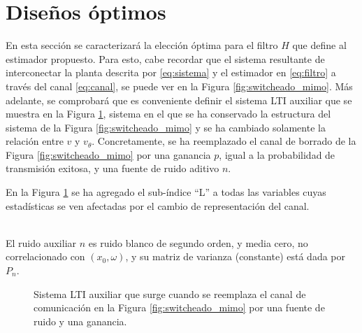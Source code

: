 \section{Dise\~nos \'optimos}\label{sec:diseno_mimo} 
En esta secci\'on se caracterizar\'a la elecci\'on \'optima para el filtro $H$ que define al estimador propuesto. Para esto, cabe recordar que el sistema resultante de interconectar la planta descrita por \eqref{eq:sistema} y el estimador en \eqref{eq:filtro} a trav\'es del canal \eqref{eq:canal}, se puede ver en la Figura \ref{fig:switcheado_mimo}. M\'as adelante, se comprobar\'a que es conveniente definir el sistema LTI auxiliar que se muestra en la Figura \ref{fig:completo-lti}, sistema en el que se ha conservado la estructura del sistema de la Figura \ref{fig:switcheado_mimo} y se ha cambiado solamente la relaci\'on entre $v$ y $v_{\theta}$. Concretamente, se ha reemplazado el canal de borrado de la Figura \ref{fig:switcheado_mimo} por una ganancia $p$, igual a la probabilidad de transmisi\'on exitosa, y una fuente de ruido aditivo $n$.

\begin{obs}
En la Figura \ref{fig:completo-lti} se ha agregado el sub-\'indice ``L'' a todas las variables cuyas estad\'isticas se ven afectadas por el cambio de representaci\'on del canal.
\end{obs}

\begin{assu}{\ \\}
El ruido auxiliar $n$ es ruido blanco de segundo orden, y media cero, no correlacionado con $(x_0,\omega)$, y su matriz de varianza (constante) est\'a dada por $P_{n}$.
\end{assu}

\newpage
\begin{figure}[htbp]
\centering
\scalebox{1.2}{}
\caption{Sistema LTI auxiliar que surge cuando se reemplaza el canal de comunicaci\'on en la Figura \ref{fig:switcheado_mimo} por una fuente de ruido y una ganancia.}
\label{fig:completo-lti}
\end{figure}

